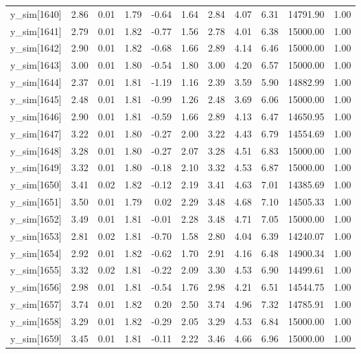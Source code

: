 \begin{table}[ht]
\begin{tabular}{rrrrrrrrrrr}
  y\_sim[1640] & 2.86 & 0.01 & 1.79 & -0.64 & 1.64 & 2.84 & 4.07 & 6.31 & 14791.90 & 1.00 \\ 
  y\_sim[1641] & 2.79 & 0.01 & 1.82 & -0.77 & 1.56 & 2.78 & 4.01 & 6.38 & 15000.00 & 1.00 \\ 
  y\_sim[1642] & 2.90 & 0.01 & 1.82 & -0.68 & 1.66 & 2.89 & 4.14 & 6.46 & 15000.00 & 1.00 \\ 
  y\_sim[1643] & 3.00 & 0.01 & 1.80 & -0.54 & 1.80 & 3.00 & 4.20 & 6.57 & 15000.00 & 1.00 \\ 
  y\_sim[1644] & 2.37 & 0.01 & 1.81 & -1.19 & 1.16 & 2.39 & 3.59 & 5.90 & 14882.99 & 1.00 \\ 
  y\_sim[1645] & 2.48 & 0.01 & 1.81 & -0.99 & 1.26 & 2.48 & 3.69 & 6.06 & 15000.00 & 1.00 \\ 
  y\_sim[1646] & 2.90 & 0.01 & 1.81 & -0.59 & 1.66 & 2.89 & 4.13 & 6.47 & 14650.95 & 1.00 \\ 
  y\_sim[1647] & 3.22 & 0.01 & 1.80 & -0.27 & 2.00 & 3.22 & 4.43 & 6.79 & 14554.69 & 1.00 \\ 
  y\_sim[1648] & 3.28 & 0.01 & 1.80 & -0.27 & 2.07 & 3.28 & 4.51 & 6.83 & 15000.00 & 1.00 \\ 
  y\_sim[1649] & 3.32 & 0.01 & 1.80 & -0.18 & 2.10 & 3.32 & 4.53 & 6.87 & 15000.00 & 1.00 \\ 
  y\_sim[1650] & 3.41 & 0.02 & 1.82 & -0.12 & 2.19 & 3.41 & 4.63 & 7.01 & 14385.69 & 1.00 \\ 
  y\_sim[1651] & 3.50 & 0.01 & 1.79 & 0.02 & 2.29 & 3.48 & 4.68 & 7.10 & 14505.33 & 1.00 \\ 
  y\_sim[1652] & 3.49 & 0.01 & 1.81 & -0.01 & 2.28 & 3.48 & 4.71 & 7.05 & 15000.00 & 1.00 \\ 
  y\_sim[1653] & 2.81 & 0.02 & 1.81 & -0.70 & 1.58 & 2.80 & 4.04 & 6.39 & 14240.07 & 1.00 \\ 
  y\_sim[1654] & 2.92 & 0.01 & 1.82 & -0.62 & 1.70 & 2.91 & 4.16 & 6.48 & 14900.34 & 1.00 \\ 
  y\_sim[1655] & 3.32 & 0.02 & 1.81 & -0.22 & 2.09 & 3.30 & 4.53 & 6.90 & 14499.61 & 1.00 \\ 
  y\_sim[1656] & 2.98 & 0.01 & 1.81 & -0.54 & 1.76 & 2.98 & 4.21 & 6.51 & 14544.75 & 1.00 \\ 
  y\_sim[1657] & 3.74 & 0.01 & 1.82 & 0.20 & 2.50 & 3.74 & 4.96 & 7.32 & 14785.91 & 1.00 \\ 
  y\_sim[1658] & 3.29 & 0.01 & 1.82 & -0.29 & 2.05 & 3.29 & 4.53 & 6.84 & 15000.00 & 1.00 \\ 
  y\_sim[1659] & 3.45 & 0.01 & 1.81 & -0.11 & 2.22 & 3.46 & 4.66 & 6.96 & 15000.00 & 1.00 \\ 

\end{tabular}
\end{table}
